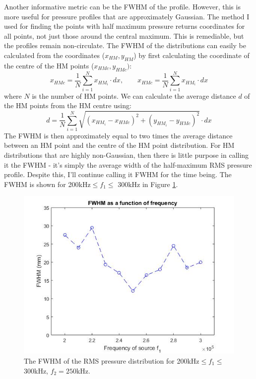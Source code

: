 \documentclass[10pt,a4paper]{article}
\begin{document}
Another informative metric can be the FWHM of the profile. However, this is more useful for pressure profiles that are approximately Gaussian. The method I used for finding the points with half maximum pressure returns coordinates for all points, not just those around the central maximum. This is remediable, but the profiles remain non-circulate. The FWHM of the distributions can easily be calculated from the coordinates ($x_{HM},y_{HM}$) by first calculating the coordinate of the centre of the HM points ($x_{HMc}, y_{HMc})$:
\begin{equation}
x_{HMc} = \frac{1}{N} \sum_{i=1}^N x_{HM_i} \cdot dx, \quad \quad x_{HMc} = \frac{1}{N} \sum_{i=1}^N x_{HM_i} \cdot dx
\end{equation}
where $N$ is the number of HM points. We can calculate the average distance $d$ of the HM points from the HM centre using:
\begin{equation}
d = \frac{1}{N}  \sum_{i=1}^N \sqrt{ (x_{HM_i} - x_{HMc})^2 + (y_{HM_i} - y_{HMc})^2} \cdot dx
\end{equation}
The FWHM is then approximately equal to two times the average distance between an HM point and the centre of the HM point distribution. For HM distributions that are highly non-Gaussian, then there is little purpose in calling it the FWHM - it's simply the average width of the half-maximum RMS pressure profile. Despite this, I'll continue calling it FWHM for the time being. The FWHM is shown for 200kHz$\leq f_1 \leq$ 300kHz in Figure \ref{FWHM_freq}.

\begin{figure}[H]\label{FWHM_freq}
\centering
\includegraphics[scale=0.6]{FWHM_freq}
\caption{The FWHM of the RMS pressure distribution for 200kHz$\leq f_1 \leq$ 300kHz, $f_2 = 250$kHz.}
\end{figure}
\end{document}
